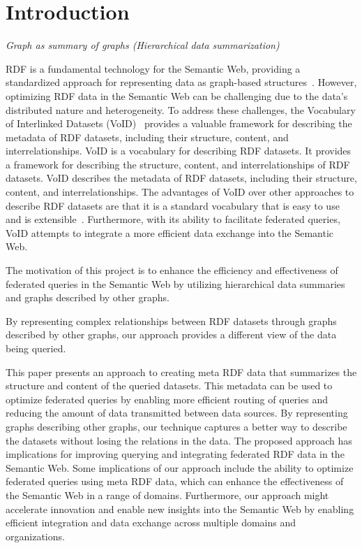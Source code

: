 \section{Introduction}\label{sec:introduction1}
\emph{Graph as summary of graphs (Hierarchical data summarization)}

RDF is a fundamental technology for the Semantic Web, providing a standardized approach for representing data as graph-based structures~\cite{the-web-of-data}. However, optimizing RDF data in the Semantic Web can be challenging due to the data's distributed nature and heterogeneity. To address these challenges, the Vocabulary of Interlinked Datasets (VoID)~\cite{documentation-void} provides a valuable framework for describing the metadata of RDF datasets, including their structure, content, and interrelationships. 
VoID is a vocabulary for describing RDF datasets. It provides a framework for describing the structure, content, and interrelationships of RDF datasets. VoID describes the metadata of RDF datasets, including their structure, content, and interrelationships. The advantages of VoID over other approaches to describe RDF datasets are that it is a standard vocabulary that is easy to use and is extensible~\cite{documentation-void}. 
Furthermore, with its ability to facilitate federated queries, VoID attempts to integrate a more efficient data exchange into the Semantic Web. 

The motivation of this project is to enhance the efficiency and effectiveness of federated queries 
in the Semantic Web by utilizing hierarchical data summaries and graphs described by other graphs.

By representing complex relationships between RDF datasets through graphs described by other graphs, our approach provides a different view of the data being queried. %

This paper presents an approach to creating meta RDF data that summarizes the structure and content of the queried datasets. 
This metadata can be used to optimize federated queries by enabling more efficient routing of queries and reducing the amount of data transmitted between data sources.
By representing graphs describing other graphs, our technique captures a better way to describe the datasets without losing the relations in the data.
The proposed approach has implications for improving querying and integrating federated RDF data in the Semantic Web. 
Some implications of our approach include the ability to optimize federated queries using meta RDF data, which can enhance the effectiveness of the Semantic Web in a range of domains. Furthermore, our approach might accelerate innovation and enable new insights into the Semantic Web by enabling efficient integration and data exchange across multiple domains and organizations.

